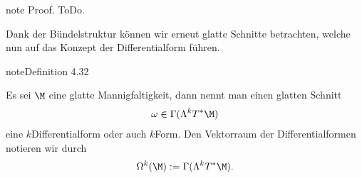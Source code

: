 \documentclass[letterpaper,10pt,english]{jupyterBook}
\begin{document}
\begin{sphinxadmonition}{note}
\sphinxAtStartPar
Proof. ToDo.
\end{sphinxadmonition}

\sphinxAtStartPar
Dank der Bündelstruktur können wir erneut glatte Schnitte betrachten, welche nun auf das Konzept der Differentialform führen.
\label{manifolds/diffformen:definition-2}
\begin{sphinxadmonition}{note}{Definition 4.32}



\sphinxAtStartPar
Es sei \(\M\) eine glatte Mannigfaltigkeit, dann nennt man einen glatten Schnitt
\begin{equation*}
\begin{split}\omega\in \Gamma(\Lambda^k T^\ast\M)\end{split}
\end{equation*}
\sphinxAtStartPar
eine \(k\)\sphinxhyphen{}Differentialform oder auch \(k\)\sphinxhyphen{}Form. Den Vektorraum der Differentialformen notieren wir durch
\begin{equation*}
\begin{split}\Omega^k(\M) := \Gamma(\Lambda^k T^\ast\M).\end{split}
\end{equation*}\end{sphinxadmonition}
\end{document}
